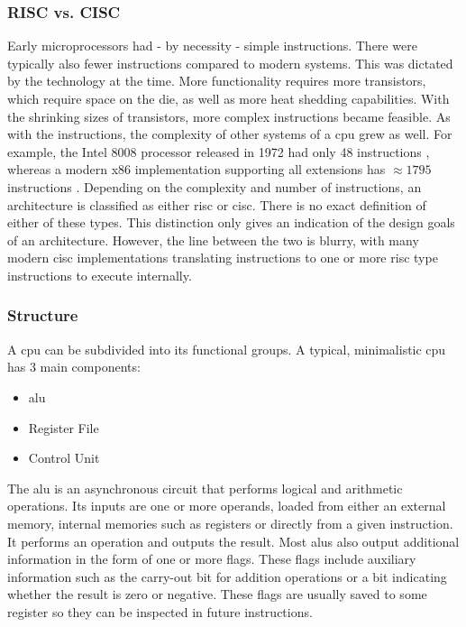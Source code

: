 \subsubsection{RISC vs. CISC}

Early microprocessors had - by necessity - simple instructions. There were typically also fewer instructions compared to modern systems. This was dictated by the technology at the time. More functionality requires more transistors, which require space on the die, as well as more heat shedding capabilities. With the shrinking sizes of transistors, more complex instructions became feasible. As with the instructions, the complexity of other systems of a \ac{cpu} grew as well. For example, the Intel 8008 processor released in 1972 \cite{intel4004history} had only 48 instructions \cite{cpu-world8008}, whereas a modern x86 implementation supporting all extensions has $\approx 1795$ instructions \cite[Chapter 7]{heule2016stratified}. Depending on the complexity and number of instructions, an architecture is classified as either \ac{risc} or \ac{cisc}. There is no exact definition of either of these types. This distinction only gives an indication of the design goals of an architecture. However, the line between the two is blurry, with many modern \ac{cisc} implementations translating instructions to one or more \ac{risc} type instructions to execute internally. 

\subsubsection{Structure} \label{sec:fundamentals_cpu_structure}

A \ac{cpu} can be subdivided into its functional groups. 
A typical, minimalistic \ac{cpu} has 3 main components:

\begin{itemize}
    \item \ac{alu}
    \item Register File
    \item Control Unit
\end{itemize}

The \ac{alu} is an asynchronous circuit that performs logical and arithmetic operations. Its inputs are one or more operands, loaded from either an external memory, internal memories such as registers or directly from a given instruction. It performs an operation and outputs the result. Most \acp{alu} also output additional information in the form of one or more flags. These flags include auxiliary information such as the carry-out bit for addition operations or a bit indicating whether the result is zero or negative. These flags are usually saved to some register so they can be inspected in future instructions.

